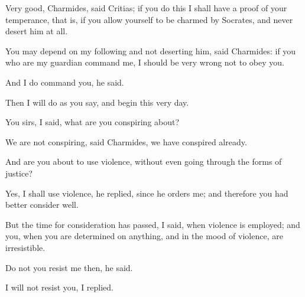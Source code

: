 \documentclass[11pt,letter]{article}
\begin{document}
\par  Very good, Charmides, said Critias; if you do this I shall have a proof of your temperance, that is, if you allow yourself to be charmed by Socrates, and never desert him at all.

\par  You may depend on my following and not deserting him, said Charmides: if you who are my guardian command me, I should be very wrong not to obey you.

\par  And I do command you, he said.

\par  Then I will do as you say, and begin this very day.

\par  You sirs, I said, what are you conspiring about?

\par  We are not conspiring, said Charmides, we have conspired already.

\par  And are you about to use violence, without even going through the forms of justice?

\par  Yes, I shall use violence, he replied, since he orders me; and therefore you had better consider well.

\par  But the time for consideration has passed, I said, when violence is employed; and you, when you are determined on anything, and in the mood of violence, are irresistible.

\par  Do not you resist me then, he said.

\par  I will not resist you, I replied.

\par 
 
\end{document}
